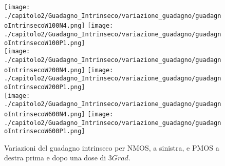 \begin{figure}[ht]
    \centering
    \texttt{[image: ./capitolo2/Guadagno\_Intrinseco/variazione\_guadagno/guadagnoIntrinsecoW100N4.png]}
    \texttt{[image: ./capitolo2/Guadagno\_Intrinseco/variazione\_guadagno/guadagnoIntrinsecoW100P1.png]}\\
    \vspace{0.2cm}
    \texttt{[image: ./capitolo2/Guadagno\_Intrinseco/variazione\_guadagno/guadagnoIntrinsecoW200N4.png]}
    \texttt{[image: ./capitolo2/Guadagno\_Intrinseco/variazione\_guadagno/guadagnoIntrinsecoW200P1.png]}\\
    \vspace{0.2cm}
    \texttt{[image: ./capitolo2/Guadagno\_Intrinseco/variazione\_guadagno/guadagnoIntrinsecoW600N4.png]}
    \texttt{[image: ./capitolo2/Guadagno\_Intrinseco/variazione\_guadagno/guadagnoIntrinsecoW600P1.png]}

    \caption[Variazione del guadagno intrinseco pre e pos irraggiamento]{Variazioni del guadagno intrinseco per NMOS, a sinistra, e PMOS a destra prima e dopo una dose di $3Grad$.}
    \label{fig:variazione_guadagnoIntrinseco}
\end{figure}